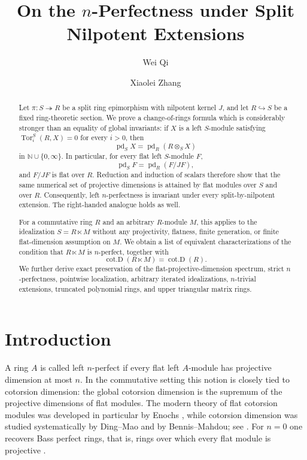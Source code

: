 \documentclass[11pt,reqno]{amsart}
\title[On the $n$-Perfectness under Split Nilpotent Extensions]
{On the $n$-Perfectness under Split Nilpotent Extensions}
\author{Wei Qi}
\author{Xiaolei Zhang}
\newcommand{\pd}{\operatorname{pd}}
\newcommand{\cotD}{\operatorname{cot.D}}
\newcommand{\Tor}{\operatorname{Tor}}
\theoremstyle{plain}
\theoremstyle{definition}
\theoremstyle{remark}
\begin{document}
\raggedbottom

\begin{abstract}
Let $\pi:S\twoheadrightarrow R$ be a split ring epimorphism with nilpotent kernel
$J$, and let $R\hookrightarrow S$ be a fixed ring-theoretic section.  We prove a
change-of-rings formula which is considerably stronger than an equality of global
invariants: if $X$ is a left $S$-module satisfying
$\Tor_i^S(R,X)=0$ for every $i>0$, then
\[
   \pd_S X=\pd_R(R\otimes_S X)
\]
in $\mathbb N\cup\{0,\infty\}$.  In particular, for every flat left
$S$-module $F$,
\[
   \pd_SF=\pd_R(F/JF),
\]
and $F/JF$ is flat over $R$.  Reduction and induction of scalars therefore show that the same numerical set of projective dimensions is attained by flat modules over $S$ and over $R$.  Consequently, left $n$-perfectness is invariant under every
split-by-nilpotent extension.  The right-handed analogue holds as well.

For a commutative ring $R$ and an arbitrary $R$-module $M$, this applies to the
idealization $S=R\ltimes M$ without any projectivity, flatness, finite generation,
or finite flat-dimension assumption on $M$.  We obtain a list of equivalent
characterizations of the condition that $R\ltimes M$ is $n$-perfect, together with
\[
   \cotD(R\ltimes M)=\cotD(R).
\]
We further derive exact preservation of the flat-projective-dimension spectrum, strict $n$-perfectness, pointwise localization, arbitrary iterated idealizations, $n$-trivial extensions, truncated polynomial rings, and upper triangular matrix rings.
\end{abstract}

\maketitle
\enlargethispage{4pt}

\section{Introduction}

A ring $A$ is called left $n$-perfect if every flat left $A$-module has
projective dimension at most $n$.  In the commutative setting this notion is
closely tied to cotorsion dimension: the global cotorsion dimension is the supremum
of the projective dimensions of flat modules.  The modern theory of flat cotorsion
modules was developed in particular by Enochs \cite{Enochs1984}, while cotorsion
dimension was studied systematically by Ding--Mao and by Bennis--Mahdou; see
\cite{MaoDing2006,BennisMahdou2009,BennisMahdouGor2009}.  For $n=0$ one recovers
Bass perfect rings, that is, rings over which every flat module is projective
\cite{Bass1960}.
\end{document}
